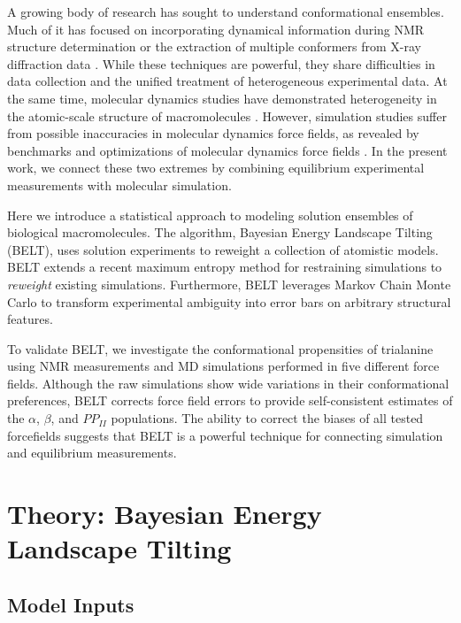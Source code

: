 \documentclass[11pt,titlepage]{article}
\begin{document}
A growing body of research has sought to understand conformational ensembles.  Much of it has focused on incorporating dynamical information during NMR structure determination \citep{lindorff2005simultaneous, lange2008recognition} or the extraction of multiple conformers from X-ray diffraction data \citep{depristo2004heterogeneity, lang2010automated}.  While these techniques are powerful, they share difficulties in data collection and the unified treatment of heterogeneous experimental data.  At the same time, molecular dynamics studies have demonstrated heterogeneity in the atomic-scale structure of macromolecules \citep{shaw2010}.   However, simulation studies suffer from possible inaccuracies in molecular dynamics force fields, as revealed by benchmarks and optimizations of molecular dynamics force fields \citep{li2011iterative, best2012optimization, lindorff2012systematic}.  In the present work, we connect these two extremes by combining equilibrium experimental measurements with molecular simulation.  

Here we introduce a statistical approach to modeling solution ensembles of biological macromolecules.  The algorithm, Bayesian Energy Landscape Tilting (BELT), uses solution experiments to reweight a collection of atomistic models.  BELT extends a recent maximum entropy method for restraining simulations \citep{chodera2012} to \emph{reweight} existing simulations.  Furthermore, BELT leverages Markov Chain Monte Carlo to transform experimental ambiguity into error bars on arbitrary structural features.  

To validate BELT, we investigate the conformational propensities of trialanine using NMR measurements \citep{Graf2007} and MD simulations performed in five different force fields.  Although the raw simulations show wide variations in their conformational preferences, BELT corrects force field errors to provide self-consistent estimates of the $\alpha$, $\beta$, and $PP_{II}$ populations.  The ability to correct the biases of all tested forcefields suggests that BELT is a powerful technique for connecting simulation and equilibrium measurements.  

\section*{Theory: Bayesian Energy Landscape Tilting}

\subsection*{Model Inputs}
\end{document}
